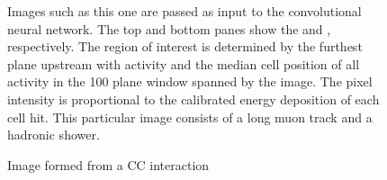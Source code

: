 \begin{figure}
\begin{center}
\begin{subfigure}[c]{0.7\textwidth}
\vspace{-20pt}
\caption*{\yview}
\end{subfigure}
\vspace{-10pt}
\end{center}
\caption{Image formed from a \numu CC interaction}{
Images such as this one are passed as input to the convolutional neural network.
The top and bottom panes show the \xview and \yview, respectively.
The region of interest is determined by the furthest plane upstream with
activity and the median cell position of all activity
in the 100 plane window spanned by the image.
The pixel intensity is proportional to the calibrated energy deposition
of each cell hit.
This particular image consists of a long muon track and a hadronic shower.}
\label{pixnumu}

\end{figure}

